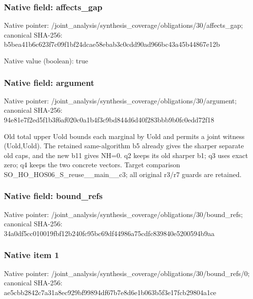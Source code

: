 \documentclass[10pt,a4paper]{article}
\begin{document}
\subsubsection{Native field: affects\_\allowbreak{}gap}
Native pointer: /joint\_\allowbreak{}analysis/synthesis\_\allowbreak{}coverage/obligations/30/affects\_\allowbreak{}gap; canonical SHA-256: b5bea41b6c623f7c09f1bf24dcae58ebab3c0cdd90ad966bc43a45b44867e12b

Native value (boolean): true

\subsubsection{Native field: argument}
Native pointer: /joint\_\allowbreak{}analysis/synthesis\_\allowbreak{}coverage/obligations/30/argument; canonical SHA-256: 94e81e7f2ed5f1b3f6af020c0a1b4f3c9bd844d6d40f283bbb9b0fc0edd72f18

\begingroup\raggedright\sloppy Old total upper Uold bounds each marginal by Uold and permits a joint witness (Uold,\allowbreak{}Uold). The retained same-algorithm b5 already gives the sharper separate old caps,\allowbreak{} and the new b11 gives NH=\allowbreak{}0. q2 keeps its old sharper b1;\allowbreak{} q3 uses exact zero;\allowbreak{} q4 keeps the two concrete vectors. Target comparison SO\_\allowbreak{}HO\_\allowbreak{}HOS06\_\allowbreak{}S\_\allowbreak{}reuse\_\allowbreak{}\_\allowbreak{}main\_\allowbreak{}\_\allowbreak{}c3;\allowbreak{} all original r3/\allowbreak{}r7 guards are retained.\par\endgroup

\subsubsection{Native field: bound\_\allowbreak{}refs}
Native pointer: /joint\_\allowbreak{}analysis/synthesis\_\allowbreak{}coverage/obligations/30/bound\_\allowbreak{}refs; canonical SHA-256: 34a0df5cc010019fbf12b240fc95bc69df44986a75cdfc839840e5200594b9aa

\subsubsection{Native item 1}
Native pointer: /joint\_\allowbreak{}analysis/synthesis\_\allowbreak{}coverage/obligations/30/bound\_\allowbreak{}refs/0; canonical SHA-256: ae5cbb2842c7a31a8ec929bf99894df67b7e8d6e1b063b5f3e17fcb29804a1ce
\end{document}
